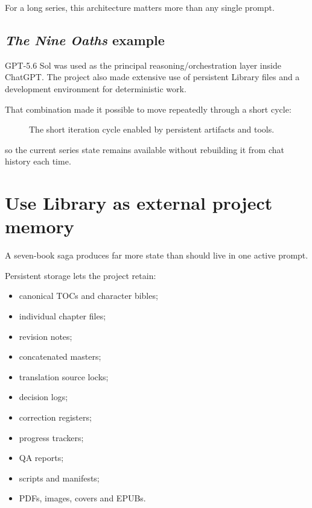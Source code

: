 \documentclass[11pt,oneside,openany]{book}
\providecommand{\tightlist}{%
  \setlength{\itemsep}{0pt}\setlength{\parskip}{0pt}}
\begin{document}
For a long series, this architecture matters more than any single prompt.

\section{\texorpdfstring{\emph{The Nine Oaths} example}{The Nine Oaths example}}\label{the-nine-oaths-example}

GPT-5.6 Sol was used as the principal reasoning/orchestration layer inside ChatGPT. The project also made extensive use of persistent Library files and a development environment for deterministic work.

That combination made it possible to move repeatedly through a short cycle:

\begin{figure}[htbp]
\centering
{}
\caption{The short iteration cycle enabled by persistent artifacts and tools.}
\end{figure}

so the current series state remains available without rebuilding it from chat history each time.

\chapter{Use Library as external project memory}

A seven-book saga produces far more state than should live in one active prompt.

Persistent storage lets the project retain:

\begin{itemize}
\tightlist
\item
  canonical TOCs and character bibles;
\item
  individual chapter files;
\item
  revision notes;
\item
  concatenated masters;
\item
  translation source locks;
\item
  decision logs;
\item
  correction registers;
\item
  progress trackers;
\item
  QA reports;
\item
  scripts and manifests;
\item
  PDFs, images, covers and EPUBs.
\end{itemize}
\end{document}
